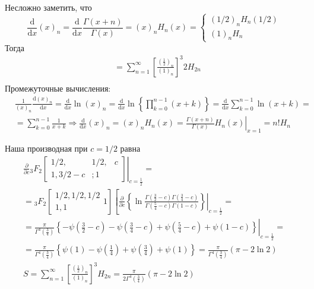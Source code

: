 	Несложно заметить, что
	$$
	\frac{\mathrm{d}}{\mathrm{d} x}(x)_n=\frac{\mathrm{d}}{\mathrm{d} x} \frac{\Gamma(x+n)}{\Gamma(x)}=(x)_n H_n(x)=\left\{\begin{array}{c}
		(1 / 2)_n H_n(1 / 2) \\
		(1)_n H_n
	\end{array}\right.
	$$
	Тогда
	$$
	\begin{aligned}
		& =\sum_{n=1}^{\infty}\left[\frac{\left(\frac{1}{2}\right)_n}{(1)_n}\right]^3 2 H_{2 n} \\
		&
	\end{aligned}
	$$
	Промежуточные вычисления:
	$$
	\begin{aligned}
		& \frac{1}{(x)_n} \frac{\mathrm{d}(x)_n}{\mathrm{~d} x}=\frac{\mathrm{d}}{\mathrm{d} x} \ln (x)_n=\frac{\mathrm{d}}{\mathrm{d} x} \ln \left\{\prod_{k=0}^{n-1}(x+k)\right\}=\frac{\mathrm{d}}{\mathrm{d} x} \sum_{k=0}^{n-1} \ln (x+k)= \\
		& =\sum_{k=0}^{n-1} \frac{1}{x+k} \Rightarrow \frac{\mathrm{d}}{\mathrm{d} x}(x)_n=(x)_n H_n(x)=\left.\frac{\Gamma(x+n)}{\Gamma(x)} H_n(x)\right|_{x=1}=n ! H_n
	\end{aligned}
	$$
	
	Наша производная при $c=1 / 2$ равна
	$$
	\begin{gathered}
		\left.\frac{\partial}{\partial c}{ }_3 F_2\left[\begin{array}{ccc}
			1 / 2, & 1 / 2, & c \\
			1,3 / 2-c & ; 1
		\end{array}\right]\right|_{c=\frac{1}{2}}= \\
		={ }_3 F_2\left[\begin{array}{c}
			1 / 2,1 / 2,1 / 2 \\
			1,1
		\end{array} 1\right]\left[\left.\frac{\partial}{\partial c}\left\{\ln \frac{\Gamma\left(\frac{3}{2}-c\right) \Gamma\left(\frac{3}{4}-c\right)}{\Gamma\left(\frac{5}{4}-c\right) \Gamma(1-c)}\right\}\right|_{c=\frac{1}{2}}=\right. \\
		=\left.\frac{\pi}{\Gamma^4\left(\frac{3}{4}\right)}\left\{-\psi\left(\frac{3}{2}-c\right)-\psi\left(\frac{3}{4}-c\right)+\psi\left(\frac{5}{4}-c\right)+\psi(1-c)\right\}\right|_{c=\frac{1}{2}}= \\
		=\frac{\pi}{\Gamma^4\left(\frac{3}{4}\right)}\left\{\psi(1)-\psi\left(\frac{1}{4}\right)+\psi\left(\frac{3}{4}\right)+\psi(1)\right\}=\frac{\pi}{\Gamma^4\left(\frac{3}{4}\right)}(\pi-2 \ln 2) \\
		S=\sum_{n=1}^{\infty}\left[\frac{\left(\frac{1}{2}\right)_n}{(1)_n}\right]^3 H_{2 n}=\frac{\pi}{2 \Gamma^4\left(\frac{3}{4}\right)}(\pi-2 \ln 2)
	\end{gathered}
	$$
	
